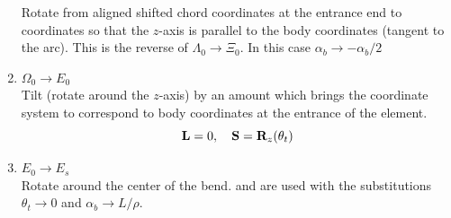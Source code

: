 \begin{enumerate}
Rotate from aligned shifted chord coordinates at the entrance end to coordinates 
so that the $z$-axis is parallel to the body coordinates (tangent to the arc). 
This is the reverse of $\Lambda_0 \longrightarrow \Xi_0$. In this case $\alpha_b \rightarrow -\alpha_b/2$
%
\item $\Omega_{0} \longrightarrow E_0$ \\
Tilt (rotate around the $z$-axis) by an amount  which brings the coordinate system to
correspond to body coordinates at the entrance of the element.
\begin{equation}
  {\bf L} = 0, \quad
  {\bf S} = {\bf R}_{z}(\theta_t)
  \label{l0sr}
\end{equation}
%
\item $E_0 \longrightarrow E_s$ \\
Rotate around the
center of the bend.  and  are used with the substitutions
$\theta_t \rightarrow 0$ and $\alpha_b \rightarrow L/\rho$.
%
\end{enumerate}
